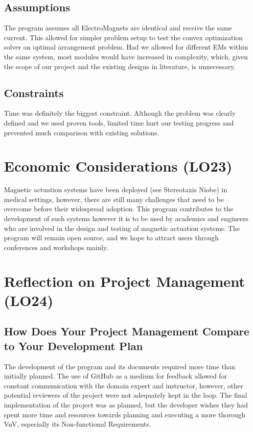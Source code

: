\documentclass{article}
\begin{document}
\subsection{Assumptions}
The program assumes all ElectroMagnets are identical and receive the same current. This allowed for simpler problem setup to test the convex optimization solver on optimal arrangement problem. Had we allowed for different EMs within the same system, most modules would have increased in complexity, which, given the scope of our project and the existing designs in literature, is unnecessary.  

\subsection{Constraints}
Time was definitely the biggest constraint. Although the problem was clearly defined and we used proven tools, limited time hurt our testing progress and prevented much comparison with existing solutions.

\section{Economic Considerations (LO23)}
Magnetic actuation systems have been deployed (see Stereotaxis Niobe) in medical settings, however, there are still many challenges that need to be overcome before their widespread adoption. This program contributes to the development of such systems however it is to be used by academics and engineers who are involved in the design and testing of magnetic actuation systems. The program will remain open source, and we hope to attract users through conferences and workshops mainly. 

\section{Reflection on Project Management (LO24)}


\subsection{How Does Your Project Management Compare to Your Development Plan}
The development of the program and its documents required more time than initially planned. The use of GitHub as a medium for feedback allowed for constant communication with the domain expert and instructor, however, other potential reviewers of the project were not adequately kept in the loop. The final implementation of the project was as planned, but the developer wishes they had spent more time and resources towards planning and executing a more thorough VnV, especially its Non-functional Requirements.
\end{document}
